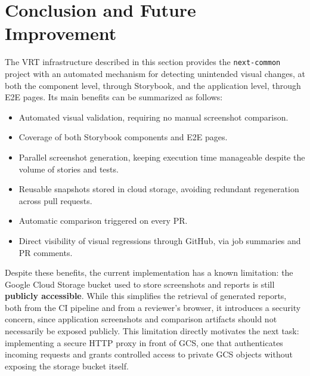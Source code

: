 \section{Conclusion and Future Improvement}

The \ac{VRT} infrastructure described in this section provides the \texttt{next-common} project with an automated mechanism for detecting unintended visual changes, at both the component level, through Storybook, and the application level, through \ac{E2E} pages. Its main benefits can be summarized as follows:

\begin{itemize}
    \item Automated visual validation, requiring no manual screenshot comparison.
    \item Coverage of both Storybook components and \ac{E2E} pages.
    \item Parallel screenshot generation, keeping execution time manageable despite the volume of stories and tests.
    \item Reusable snapshots stored in cloud storage, avoiding redundant regeneration across pull requests.
    \item Automatic comparison triggered on every \ac{PR}.
    \item Direct visibility of visual regressions through GitHub, via job summaries and \ac{PR} comments.
\end{itemize}

Despite these benefits, the current implementation has a known limitation: the Google Cloud Storage bucket used to store screenshots and reports is still \textbf{publicly accessible}. While this simplifies the retrieval of generated reports, both from the \ac{CI} pipeline and from a reviewer's browser, it introduces a security concern, since application screenshots and comparison artifacts should not necessarily be exposed publicly. This limitation directly motivates the next task: implementing a secure \ac{HTTP} proxy in front of \ac{GCS}, one that authenticates incoming requests and grants controlled access to private \ac{GCS} objects without exposing the storage bucket itself.

\clearpage
